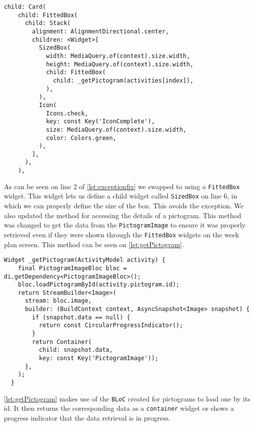 \begin{lstlisting}[caption={An excerpt showing the use of FittedBox instead of PictogramImage},label={lst:exceptionfix}]
  child: Card(
    child: FittedBox(
      child: Stack(
        alignment: AlignmentDirectional.center,
        children: <Widget>[
          SizedBox(
            width: MediaQuery.of(context).size.width,
            height: MediaQuery.of(context).size.width,
            child: FittedBox(
              child: _getPictogram(activities[index]),
            ),
          ),
          Icon(
            Icons.check,
            key: const Key('IconComplete'),
            size: MediaQuery.of(context).size.width,
            color: Colors.green,
          ),
        ],
      ),
    ),
\end{lstlisting}
As can be seen on line 2 of \autoref{lst:exceptionfix} we swapped to using a \texttt{FittedBox} widget. This widget lets us define a child widget called \texttt{SizedBox} on line 6, in which we can properly define the size of the box. This avoids the exception.
We also updated the method for accessing the details of a pictogram.
This method was changed to get the data from the \texttt{PictogramImage} to ensure it was properly retrieved even if they were shown through the \texttt{FittedBox} widgets on the week plan screen.
This method can be seen on \autoref{lst:getPictogram}.
\begin{lstlisting}[caption={The getPictogram method to retrieve the details of a pictogram},label={lst:getPictogram}]
  Widget _getPictogram(ActivityModel activity) {
    final PictogramImageBloc bloc = di.getDependency<PictogramImageBloc>();
    bloc.loadPictogramById(activity.pictogram.id);
    return StreamBuilder<Image>(
      stream: bloc.image,
      builder: (BuildContext context, AsyncSnapshot<Image> snapshot) {
        if (snapshot.data == null) {
          return const CircularProgressIndicator();
        }
        return Container(
          child: snapshot.data, 
          key: const Key('PictogramImage'));
      },
    );
  }
\end{lstlisting}
\autoref{lst:getPictogram} makes use of the \texttt{BLoC} created for pictograms to load one by its id.
It then returns the corresponding data as a \texttt{container} widget or shows a progress indicator that the data retrieval is in progress.
